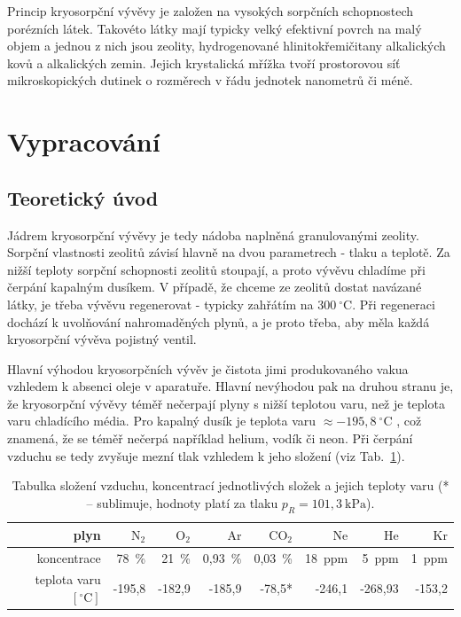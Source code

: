 \documentclass[english]{article}
\newcommand{\unit}[1]{~\mathrm{#1}}
\newcommand{\unitb}[1]{~\mathrm{[#1]}}
\begin{document}
Princip kryosorpční vývěvy je založen na vysokých sorpčních schopnostech porézních látek. Takovéto látky mají typicky velký efektivní povrch na malý objem a jednou z nich jsou zeolity, hydrogenované hlinitokřemičitany alkalických kovů a alkalických zemin. Jejich krystalická mřížka tvoří prostorovou síť mikroskopických dutinek o rozměrech v řádu jednotek nanometrů či méně. 


\section{Vypracování}
    \subsection{Teoretický úvod}				
		Jádrem kryosorpční vývěvy je tedy nádoba naplněná granulovanými zeolity. Sorpční vlastnosti zeolitů závisí hlavně na dvou parametrech - tlaku a teplotě. Za nižší teploty sorpční schopnosti zeolitů stoupají, a proto vývěvu chladíme při čerpání kapalným dusíkem. V případě, že chceme ze zeolitů dostat navázané látky, je třeba vývěvu regenerovat - typicky zahřátím na $300\unit{^\circ C}$. Při regeneraci dochází k uvolňování nahromaděných plynů, a je proto třeba, aby měla každá kryosorpční vývěva pojistný ventil. 
		
		Hlavní výhodou kryosorpčních vývěv je čistota jimi produkovaného vakua vzhledem k absenci oleje v aparatuře. Hlavní nevýhodou pak na druhou stranu je, že kryosorpční vývěvy téměř nečerpají plyny s nižší teplotou varu, než je teplota varu chladícího média. Pro kapalný dusík je teplota varu $\approx-195,8\unit{^\circ C}$ \cite{bib:tabulky}, což znamená, že se téměř nečerpá například helium, vodík či neon. Při čerpání vzduchu se tedy zvyšuje mezní tlak vzhledem k jeho složení (viz Tab.~\ref{tab:slozeni_vzduchu}).
		
\begin{table}[htbp]
\centering
\begin{tabular}{rrrrrrrr}
\toprule
plyn  & $\mathrm{N_2}$ & $\mathrm{O_2}$ & $\mathrm{Ar}$ & $\mathrm{CO_2}$ & $\mathrm{Ne}$ & $\mathrm{He}$ & $\mathrm{Kr}$ \\
\midrule
koncentrace & 78~\% & 21~\% & 0,93~\% & 0,03~\% & 18~ppm & 5~ppm & 1~ppm \\
teplota varu $\unitb{^\circ C}$ & -195,8 & -182,9 & -185,9 &  -78,5* & -246,1 & -268,93 & -153,2 \\
\bottomrule
\end{tabular}%
\caption{Tabulka složení vzduchu, koncentrací jednotlivých složek \cite{bib:praskripta} a jejich teploty varu \cite{bib:tabulky} (* -- sublimuje, hodnoty platí za tlaku $p_R=101,3\unit{kPa}$).  }
\label{tab:slozeni_vzduchu}%
\end{table}%
\end{document}
